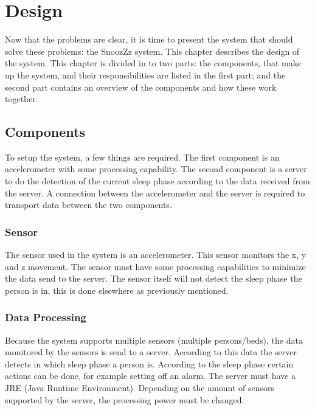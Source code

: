 \chapter{Design} %
\label{cha:design}
Now that the problems are clear, it is time to present the system that should solve these problems: the SnoozZz system. This chapter describes the design of the system. This chapter is divided in to two parts: the components, that make up the system, and their responsibilities are listed in the first part; and the second part contains an overview of the components and how these work together.

\section{Components} %
\label{sec:components}
To setup the system, a few things are required. The first component is an accelerometer with some processing capability. The second component is a server to do the detection of the current sleep phase according to the data received from the server. A connection between the accelerometer and the server is required to transport data between the two components.
\subsection{Sensor} %
\label{sub:sensor}
The sensor used in the system is an accelerometer. This sensor monitors the x, y and z movement.
The sensor must have some processing capabilities to minimize the data send to the server. The sensor itself will not detect the sleep phase the person is in, this is done elsewhere as previously mentioned.
\subsection{Data Processing} %
\label{sub:data_processing}
Because the system supports multiple sensors (multiple persons/beds), the data monitored by the sensors is send to a server. According to this data the server detects in which sleep phase a person is.
According to the sleep phase certain actions can be done, for example setting off an alarm.
The server must have a JRE (Java Runtime Environment). Depending on the amount of sensors supported by the server, the processing power must be changed.
